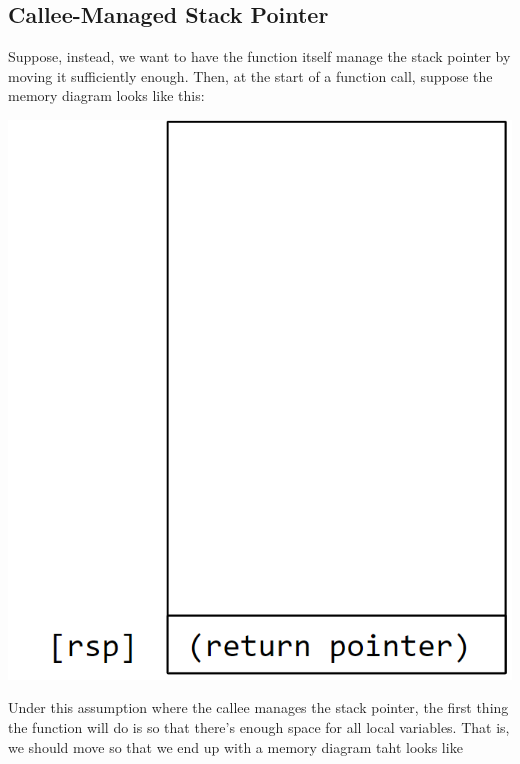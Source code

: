 \documentclass[letterpaper]{article}
\begin{document}
\subsection{Callee-Managed Stack Pointer}
Suppose, instead, we want to have the function itself manage the stack pointer by moving it sufficiently enough. Then, at the start of a function call, suppose the memory diagram looks like this: 
\begin{center}
    \includegraphics[scale=0.3]{../assets/callee_stack_mnged_init.png}
\end{center}
Under this assumption where the callee manages the stack pointer, the first thing the function will do is  so that there's enough space for all local variables. That is, we should move \code{[rsp]} so that we end up with a memory diagram taht looks like 
\end{document}
